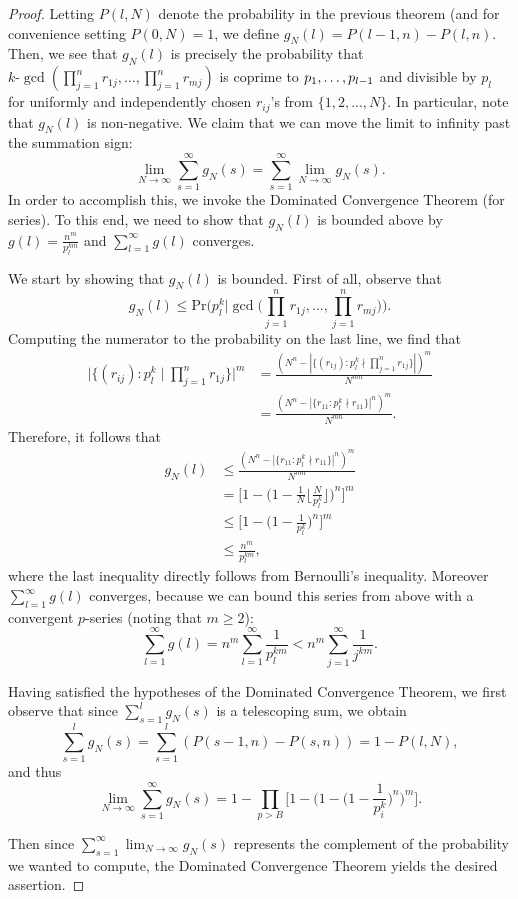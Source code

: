 \documentclass[12pt]{amsart}
\theoremstyle{definition}
\begin{document}
\begin{proof}
	Letting $P(l, N)$ denote the probability in the previous theorem (and for convenience setting $P(0, N) = 1$, we define $g_N(l) = P(l-1, n) - P(l, n)$. Then, we see that $g_N(l)$ is precisely the probability that $k\text{-}\gcd(\prod_{j=1}^n r_{1j}, ... , \prod_{j=1}^n r_{mj})$ is coprime to $p_1, \mathellipsis, p_{l-1}$ and divisible by $p_l$ for uniformly and independently chosen $r_{ij}$'s from $\{1, 2, ..., N\}$. In particular, note that $g_N(l)$ is non-negative. We claim that we can move the limit to infinity past the summation sign:
	$$\lim_{N \to \infty} \sum_{s=1}^{\infty} g_N(s) = \sum_{s=1}^{\infty} \lim_{N \to \infty} g_N(s).$$
	In order to accomplish this, we invoke the Dominated Convergence Theorem (for series). To this end, we need to show that $g_N(l)$ is bounded above by $g(l) = \frac{n^m}{p_{l}^{km}}$ and $\sum_{l=1}^{\infty} g(l)$ converges.
	
	We start by showing that $g_N(l)$ is bounded. First of all, observe that
	$$g_N(l) \leq \text{Pr}\Big(p_l^k \Big| \gcd\Big(\prod_{j=1}^n r_{1j}, ... , \prod_{j=1}^n r_{mj}\Big)\Big).$$
	Computing the numerator to the probability on the last line, we find that
	\begin{align*} 
		\Big|\{(r_{ij}) : p_l^k \mid \prod_{j=1}^n r_{1j}\}\Big|^m &= \frac{(N^n - |\{(r_{1j}) : p_l^k \nmid \prod_{j=1}^n r_{1j}\}|)^m}{N^{mn}}\\
		&= \frac{(N^n - |\{r_{11} : p_l^k \nmid r_{11}\}|^n)^m}{N^{mn}}. \end{align*}
	Therefore, it follows that
	\begin{align*} 
		g_N(l) &\leq \frac{(N^n - |\{r_{11} : p_l^k \nmid r_{11}\}|^n)^m}{N^{mn}}\\
		&= \Big[1 - \Big(1 - \frac{1}{N} \Big\lfloor \frac{N}{p_l^k}\Big\rfloor\Big)^n\Big]^m\\
		&\leq \Big[1 - \Big(1 - \frac{1}{p_l^k}\Big)^n\Big]^m\\
        &\leq \frac{n^m}{p_l^{km}},\end{align*}
	where the last inequality directly follows from Bernoulli's inequality. Moreover $\sum_{l=1}^{\infty} g(l)$ converges, because we can bound this series from above with a convergent $p$-series (noting that $m \geq 2$):
	$$\sum_{l=1}^{\infty} g(l) = n^m \sum_{l=1}^{\infty} \frac{1}{p_l^{km}} < n^m \sum_{j=1}^{\infty} \frac{1}{j^{km}}.$$
	
	Having satisfied the hypotheses of the Dominated Convergence Theorem, we first observe that since $\sum_{s=1}^l g_N(s)$ is a telescoping sum, we obtain
	$$\sum_{s=1}^l g_N(s) = \sum_{s=1}^l (P(s-1, n) - P(s, n)) = 1 - P(l, N),$$ 
	and thus
	$$\lim_{N \to \infty} \sum_{s=1}^{\infty} g_N(s) = 1 - \prod_{p > B} \Big[1 - \Big(1 - \Big(1 - \frac{1}{p^k_i}  \Big)^n\Big)^m\Big].$$
	
	\noindent Then since $\displaystyle \sum_{s=1}^{\infty} \lim_{N \to \infty} g_N(s)$ represents the complement of the probability we wanted to compute, the Dominated Convergence Theorem yields the desired assertion.
\end{proof}
\end{document}
